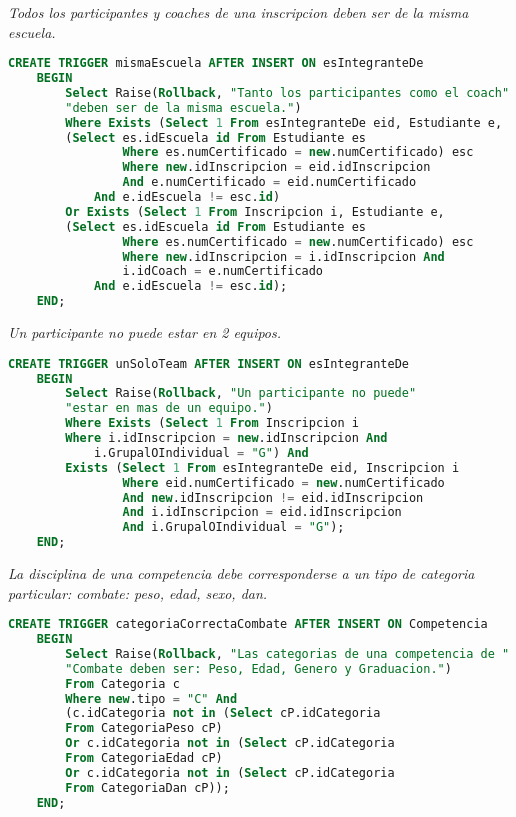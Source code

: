 \emph{Todos los participantes y coaches de una inscripcion deben ser de la misma escuela.}

\begin{lstlisting}[language=SQL]
CREATE TRIGGER mismaEscuela AFTER INSERT ON esIntegranteDe
    BEGIN
        Select Raise(Rollback, "Tanto los participantes como el coach" 
        "deben ser de la misma escuela.")
        Where Exists (Select 1 From esIntegranteDe eid, Estudiante e, 
        (Select es.idEscuela id From Estudiante es
                Where es.numCertificado = new.numCertificado) esc
                Where new.idInscripcion = eid.idInscripcion 
                And e.numCertificado = eid.numCertificado
            And e.idEscuela != esc.id)
        Or Exists (Select 1 From Inscripcion i, Estudiante e, 
        (Select es.idEscuela id From Estudiante es
                Where es.numCertificado = new.numCertificado) esc
                Where new.idInscripcion = i.idInscripcion And 
                i.idCoach = e.numCertificado
            And e.idEscuela != esc.id);
    END;
\end{lstlisting}

\emph{Un participante no puede estar en 2 equipos.}

\begin{lstlisting}[language=SQL]
CREATE TRIGGER unSoloTeam AFTER INSERT ON esIntegranteDe
    BEGIN
        Select Raise(Rollback, "Un participante no puede"
        "estar en mas de un equipo.")
        Where Exists (Select 1 From Inscripcion i 
        Where i.idInscripcion = new.idInscripcion And 
            i.GrupalOIndividual = "G") And 
        Exists (Select 1 From esIntegranteDe eid, Inscripcion i 
                Where eid.numCertificado = new.numCertificado 
                And new.idInscripcion != eid.idInscripcion
                And i.idInscripcion = eid.idInscripcion 
                And i.GrupalOIndividual = "G");
    END;
\end{lstlisting}
  
\emph{
  La disciplina de una competencia debe corresponderse a un tipo de categoria particular: combate: peso, edad, sexo, dan.
}

\begin{lstlisting}[language=SQL]
CREATE TRIGGER categoriaCorrectaCombate AFTER INSERT ON Competencia
    BEGIN
        Select Raise(Rollback, "Las categorias de una competencia de "
        "Combate deben ser: Peso, Edad, Genero y Graduacion.")
        From Categoria c
        Where new.tipo = "C" And
        (c.idCategoria not in (Select cP.idCategoria 
        From CategoriaPeso cP)
        Or c.idCategoria not in (Select cP.idCategoria 
        From CategoriaEdad cP)
        Or c.idCategoria not in (Select cP.idCategoria 
        From CategoriaDan cP));
    END;
\end{lstlisting}
  
